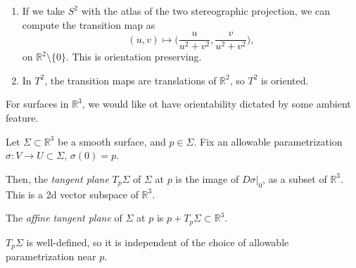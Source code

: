 \documentclass[12pt]{article}
\begin{document}
\begin{exbox}
	\begin{enumerate}[1.]
		\item If we take $S^2$ with the atlas of the two stereographic projection, we can compute the transition map as
			\[
				(u, v) \mapsto \biggl( \frac{u}{u^2 + v^2}, \frac{v}{u^2 + v^2} \biggr)
			,\]
			on $\mathbb{R}^2 \setminus \{0\}$. This is orientation preserving.
		\item In $T^2$, the transition maps are translations of $\mathbb{R}^2$, so $T^2$ is oriented.
	\end{enumerate}
\end{exbox}

For surfaces in $\mathbb{R}^3$, we would like ot have orientability dictated by some ambient feature.

\begin{definition}
	Let $\Sigma \subset \mathbb{R}^3$ be a smooth surface, and $p \in \Sigma$. Fix an allowable parametrization $\sigma : V \to U \subset \Sigma$, $\sigma(0) = p$.

	Then, the \emph{tangent plane} $T_p \Sigma$ of $\Sigma$ at $p$ is the image of $D\sigma|_{0}$, as a subset of $\mathbb{R}^3$. This is a 2d vector subspace of $\mathbb{R}^3$.

	The \emph{affine tangent plane} of $\Sigma$ at $p$ is $p + T_p \Sigma \subset \mathbb{R}^3$.
\end{definition}

\begin{lemma}
	$T_p \Sigma$ is well-defined, so it is independent of the choice of allowable parametrization near $p$.
\end{lemma}



\newpage

\printindex
\end{document}
